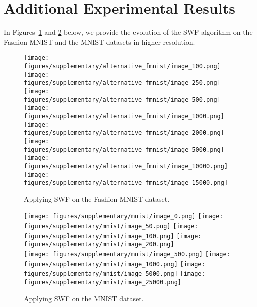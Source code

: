 


\section{Additional Experimental Results}

In Figures~\ref{fig:suppfmnist} and \ref{fig:suppmnist} below, we provide the evolution of the SWF algorithm on the Fashion MNIST and the MNIST datasets in higher resolution.

\begin{figure}
\centering
\texttt{[image: figures/supplementary/alternative\_fmnist/image\_100.png]}
\texttt{[image: figures/supplementary/alternative\_fmnist/image\_250.png]}
\texttt{[image: figures/supplementary/alternative\_fmnist/image\_500.png]}
\texttt{[image: figures/supplementary/alternative\_fmnist/image\_1000.png]}\\
\texttt{[image: figures/supplementary/alternative\_fmnist/image\_2000.png]}
\texttt{[image: figures/supplementary/alternative\_fmnist/image\_5000.png]}
\texttt{[image: figures/supplementary/alternative\_fmnist/image\_10000.png]}
\texttt{[image: figures/supplementary/alternative\_fmnist/image\_15000.png]}
\caption{Applying SWF on the Fashion MNIST dataset.}
\label{fig:suppfmnist}
\end{figure}


\begin{figure}
\centering
\texttt{[image: figures/supplementary/mnist/image\_0.png]}
\texttt{[image: figures/supplementary/mnist/image\_50.png]}
\texttt{[image: figures/supplementary/mnist/image\_100.png]}
\texttt{[image: figures/supplementary/mnist/image\_200.png]}\\
\texttt{[image: figures/supplementary/mnist/image\_500.png]}
\texttt{[image: figures/supplementary/mnist/image\_1000.png]}
\texttt{[image: figures/supplementary/mnist/image\_5000.png]}
\texttt{[image: figures/supplementary/mnist/image\_25000.png]}
\caption{Applying SWF on the MNIST dataset.}
\label{fig:suppmnist}
\end{figure}




